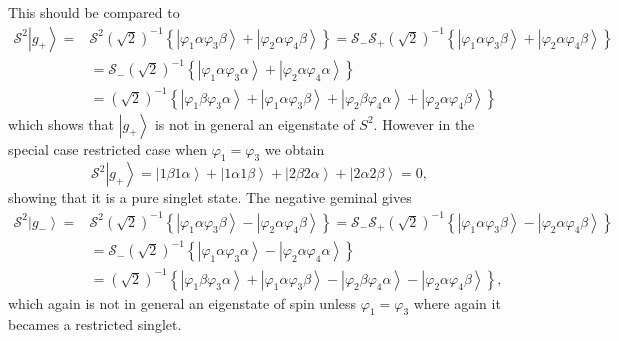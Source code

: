 \documentclass[aps,preprint]{revtex4}%
\begin{document}
This should be compared to%
\begin{align*}
\mathcal{S}^{2}\left\vert g_{+}\right\rangle =  &  \mathcal{S}^{2}\left(
\sqrt{2}\right)  ^{-1}\left\{  \left\vert \varphi_{1}\alpha\varphi_{3}%
\beta\right\rangle +\left\vert \varphi_{2}\alpha\varphi_{4}\beta\right\rangle
\right\}  =\mathcal{S}_{-}\mathcal{S}_{+}\left(  \sqrt{2}\right)
^{-1}\left\{  \left\vert \varphi_{1}\alpha\varphi_{3}\beta\right\rangle
+\left\vert \varphi_{2}\alpha\varphi_{4}\beta\right\rangle \right\} \\
&  =\mathcal{S}_{-}\left(  \sqrt{2}\right)  ^{-1}\left\{  \left\vert
\varphi_{1}\alpha\varphi_{3}\alpha\right\rangle +\left\vert \varphi_{2}%
\alpha\varphi_{4}\alpha\right\rangle \right\} \\
&  =\left(  \sqrt{2}\right)  ^{-1}\left\{  \left\vert \varphi_{1}\beta
\varphi_{3}\alpha\right\rangle +\left\vert \varphi_{1}\alpha\varphi_{3}%
\beta\right\rangle +\left\vert \varphi_{2}\beta\varphi_{4}\alpha\right\rangle
+\left\vert \varphi_{2}\alpha\varphi_{4}\beta\right\rangle \right\}
\end{align*}
which shows that $\left\vert g_{+}\right\rangle $ is not in general an
eigenstate of $S^{2}$. However in the special case restricted case when
$\varphi_{1}=\varphi_{3}$ we obtain
\[
\mathcal{S}^{2}\left\vert g_{+}\right\rangle =\left\vert 1\beta1\alpha
\right\rangle +\left\vert 1\alpha1\beta\right\rangle +\left\vert 2\beta
2\alpha\right\rangle +\left\vert 2\alpha2\beta\right\rangle =0,
\]
showing that it is a pure singlet state. The negative geminal gives
\begin{align*}
\mathcal{S}^{2}\left\vert g_{-}\right\rangle =  &  \mathcal{S}^{2}\left(
\sqrt{2}\right)  ^{-1}\left\{  \left\vert \varphi_{1}\alpha\varphi_{3}%
\beta\right\rangle -\left\vert \varphi_{2}\alpha\varphi_{4}\beta\right\rangle
\right\}  =\mathcal{S}_{-}\mathcal{S}_{+}\left(  \sqrt{2}\right)
^{-1}\left\{  \left\vert \varphi_{1}\alpha\varphi_{3}\beta\right\rangle
-\left\vert \varphi_{2}\alpha\varphi_{4}\beta\right\rangle \right\} \\
&  =\mathcal{S}_{-}\left(  \sqrt{2}\right)  ^{-1}\left\{  \left\vert
\varphi_{1}\alpha\varphi_{3}\alpha\right\rangle -\left\vert \varphi_{2}%
\alpha\varphi_{4}\alpha\right\rangle \right\} \\
&  =\left(  \sqrt{2}\right)  ^{-1}\left\{  \left\vert \varphi_{1}\beta
\varphi_{3}\alpha\right\rangle +\left\vert \varphi_{1}\alpha\varphi_{3}%
\beta\right\rangle -\left\vert \varphi_{2}\beta\varphi_{4}\alpha\right\rangle
-\left\vert \varphi_{2}\alpha\varphi_{4}\beta\right\rangle \right\}  ,
\end{align*}
which again is not in general an eigenstate of spin unless $\varphi
_{1}=\varphi_{3}$ where again it becames a restricted singlet.
\end{document}
